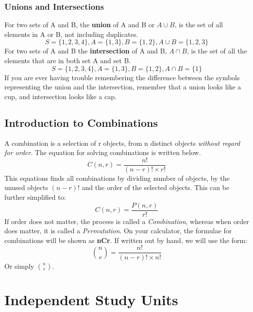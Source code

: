 \documentclass[final,1p,12pt]{elsarticle}
\begin{document}
        \subsubsection{Unions and Intersections}
        For two sets of A and B, the \textbf{union} of A and B or $A\cup B$, is the set of all elements in A or B, not including duplicates.
        \begin{equation}
            S = \{1,2,3,4\}, A = \{1,3\}, B =\{1,2\}, A\cup B=\{1,2,3\}
        \end{equation}
        For two sets of A and B the \textbf{intersection} of A and B, $A\cap B$, is the set of all the elements that are in both set A and set B.
        \begin{equation}
            S = \{1,2,3,4\}, A = \{1,3\}, B =\{1,2\}, A\cap B=\{1\}
        \end{equation}
        If you are ever having trouble remembering the difference between the symbols representing the union and the intersection, remember that a union looks like a cup, and intersection looks like a cap.
    
    \subsection{Introduction to Combinations}
    A combination is a selection of r objects, from n distinct objects \emph{without regard for order}. The equation for solving combinations is written below.
    \begin{equation}
        C(n,r) = \frac{n!}{(n-r)!\times r!}
    \end{equation}
    This equations finds all combinations by dividing number of objects, by the unused objects $(n-r)!$ and the order of the selected objects. This can be further simplified to:
    \begin{equation}
        C(n,r) = \frac{P(n,r)}{r!}
    \end{equation}
    If order does not matter, the process is called a \emph{Combination}, whereas when order does matter, it is called a \emph{Permutation}. On your calculator, the formulae for combinations will be shown as \textbf{nCr}. If written out by hand, we will use the form:
    \begin{equation}
        \binom{n}{r} = \frac{n!}{(n-r)!\times n!}
    \end{equation}
    Or simply \(\binom{n}{r}\).

\section{Independent Study Units}
\end{document}
